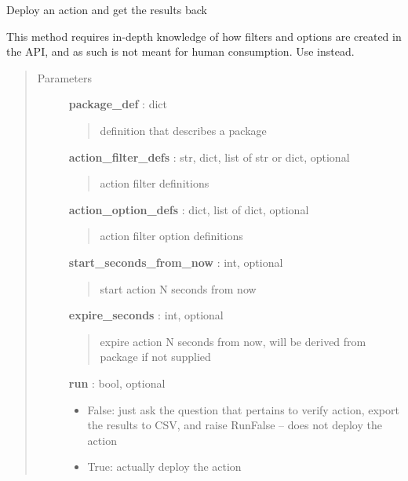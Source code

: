 \documentclass[letterpaper,10pt,english]{sphinxmanual}
\begin{document}
\begin{fulllineitems}
\label{pytan.handler:pytan.handler.Handler.deploy_action}
Deploy an action and get the results back

This method requires in-depth knowledge of how filters and options are created in the API, and as such is not meant for human consumption. Use {\hyperref[pytan.handler:pytan.handler.Handler.deploy_action_human]{}} instead.
\begin{quote}\begin{description}
\item[{Parameters}] \leavevmode
\textbf{package\_def} : dict
\begin{quote}

definition that describes a package
\end{quote}

\textbf{action\_filter\_defs} : str, dict, list of str or dict, optional
\begin{quote}

action filter definitions
\end{quote}

\textbf{action\_option\_defs} : dict, list of dict, optional
\begin{quote}

action filter option definitions
\end{quote}

\textbf{start\_seconds\_from\_now} : int, optional
\begin{quote}

start action N seconds from now
\end{quote}

\textbf{expire\_seconds} : int, optional
\begin{quote}

expire action N seconds from now, will be derived from package if not supplied
\end{quote}

\textbf{run} : bool, optional
\begin{itemize}
\item {} 
False: just ask the question that pertains to verify action, export the results to CSV, and raise RunFalse -- does not deploy the action

\item {} 
True: actually deploy the action


\end{itemize}
\end{description}
\end{quote}
\end{fulllineitems}
\end{document}
